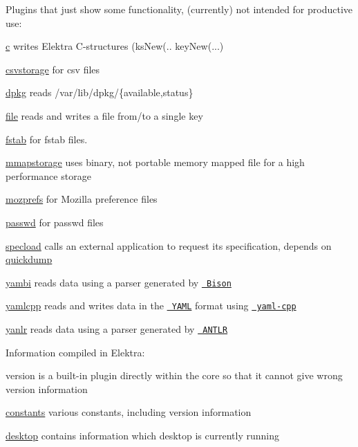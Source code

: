Plugins that just show some functionality, (currently) not intended for productive use\+:


\begin{DoxyItemize}
\item \mbox{\hyperlink{autotoc_md70_src_plugins_c_README_md}{c}} writes Elektra C-\/structures ({\ttfamily ks\+New(.. key\+New(...})
\item \mbox{\hyperlink{autotoc_md126_src_plugins_csvstorage_README_md}{csvstorage}} for csv files
\item \mbox{\hyperlink{autotoc_md197_src_plugins_dpkg_README_md}{dpkg}} reads /var/lib/dpkg/\{available,status\}
\item \mbox{\hyperlink{autotoc_md221_src_plugins_file_README_md}{file}} reads and writes a file from/to a single key
\item \mbox{\hyperlink{autotoc_md235_src_plugins_fstab_README_md}{fstab}} for fstab files.
\item \mbox{\hyperlink{autotoc_md429_src_plugins_mmapstorage_README_md}{mmapstorage}} uses binary, not portable memory mapped file for a high performance storage
\item \mbox{\hyperlink{autotoc_md472_src_plugins_mozprefs_README_md}{mozprefs}} for Mozilla preference files
\item \mbox{\hyperlink{autotoc_md514_src_plugins_passwd_README_md}{passwd}} for passwd files
\item \mbox{\hyperlink{autotoc_md657_src_plugins_specload_README_md}{specload}} calls an external application to request its specification, depends on \mbox{\hyperlink{autotoc_md561_src_plugins_quickdump_README_md}{quickdump}}
\item \mbox{\hyperlink{autotoc_md753_src_plugins_yambi_README_md}{yambi}} reads data using a parser generated by \href{https://www.gnu.org/software/bison}{\texttt{ Bison}}
\item \mbox{\hyperlink{autotoc_md780_src_plugins_yamlcpp_README_md}{yamlcpp}} reads and writes data in the \href{http://www.yaml.org}{\texttt{ Y\+A\+ML}} format using \href{https://github.com/jbeder/yaml-cpp}{\texttt{ yaml-\/cpp}}
\item \mbox{\hyperlink{autotoc_md861_src_plugins_yanlr_README_md}{yanlr}} reads data using a parser generated by \href{http://www.antlr.org}{\texttt{ A\+N\+T\+LR}}
\end{DoxyItemize}

Information compiled in Elektra\+:


\begin{DoxyItemize}
\item version is a built-\/in plugin directly within the core so that it cannot give wrong version information
\item \mbox{\hyperlink{autotoc_md106_src_plugins_constants_README_md}{constants}} various constants, including version information
\item \mbox{\hyperlink{autotoc_md178_src_plugins_desktop_README_md}{desktop}} contains information which desktop is currently running
\end{DoxyItemize}

